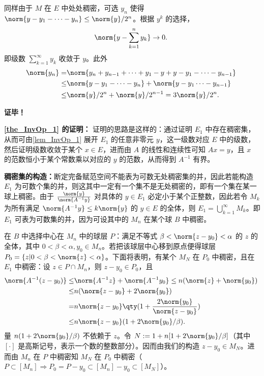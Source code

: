 同样由于 $M$ 在 $E$ 中处处稠密，可选 $y_n$ 使得 $\norm{y-y_1-\cdots-y_n}\leq\norm{y}/2^n$。根据 $y^k$ 的选择，
\begin{equation}
\norm{y-\sum_{k=1}^n y_k}\rightarrow0.~
\end{equation}
即级数 $\sum_{k=1}^\infty y_k$ 收敛于 $y$。此外
\begin{equation}
\begin{aligned}
\norm{y_n}=&\norm{y_n+y_{n-1}+\cdots+y_1-y+y-y_1-\cdots-y_{n-1}}\\
\leq&\norm{y-y_1-\cdots-y_{n}}+\norm{y-y_1\cdots-y_{n-1}}\\
\leq&\norm{y}/2^n+\norm{y}/2^{n-1}=3\norm{y}/2^n.
\end{aligned}~
\end{equation}

\textbf{证毕！}

\textbf{\autoref{the_InvOp_1} 的证明：}
证明的思路是这样的：通过证明 $E_1$ 中存在稠密集，从而可由\autoref{lem_InvOp_1} 展开 $E_1$ 的任意非零元 $y$，这一级数对应 $E$ 中的级数，然后证明级数收敛于某个 $x\in E$，进而由 $A$ 的线性和连续性可知 $Ax=y$，且 $x$ 的范数恒小于某个常数乘以对应的 $y$ 的范数，从而得到 $A^{-1}$ 有界。

\textbf{稠密集的构造：}断定完备赋范空间不能表为可数无处稠密集的并，因此若能构造 $E_1$ 为可数个集的并，则这其中一定有一个集不是无处稠密的，即有一个集在某一球上稠密。由于 $\frac{\norm{y}}{\norm{A^{-1}y}}$ 对具体的 $y\in E_1$ 必定小于某个正整数，因此若令 $M_k$ 为所有满足 $\norm{A^{-1}y}\leq k\norm{y}$ 的 $y\in E$ 的全体，则 $E_1=\bigcup\limits_{k=1}^\infty M_k$。即 $E_1$ 可表为可数集的并，因为可设其中的 $M_n$ 在某个球 $B$ 中稠密。

在 $B$ 中选择中心在 $M_n$ 中的球层 $P$：满足不等式 $\beta<\norm{z-y_0}<\alpha$ 的 $z$ 的全体，其中 $0<\beta<\alpha,y_0\in M_n$。若把该球层中心移到原点便得球层 $P_0=\{z|0<\beta<\norm{z}<\alpha\}$。下面将表明，有某个 $M_N$ 在 $P_0$ 中稠密，且在 $E_1$ 中稠密：设 $z\in P\cap M_n$，则 $z-y_0\in P_0$，且
\begin{equation}
\begin{aligned}
\norm{A^{-1}(z-y_0)}\leq&\norm{A^{-1}z}+\norm{A^{-1}y_0}\leq n(\norm{z}+\norm{y_0})\\
\leq&n(\norm{z-y_0}+2\norm{y_0})\\
=&n\norm{z-y_0}\qty(1+\frac{2\norm{y_0}}{\norm{z-y_0}})\\
\leq& n\norm{z-y_0}(1+2\norm{y_0}/\beta).
\end{aligned}~
\end{equation}
量 $n(1+2\norm{y_0}/\beta)$ 不依赖于 $z$。令 $N:=1+n[1+2\norm{y_0}/\beta]$（其中 $[\cdot]$ 是高斯记号，表示一个数的整数部分）。因而由我们的构造 $z-y_0\in M_N$。进而由 $M_n$ 在 $P$ 中稠密知 $M_N$ 在 $P_0$ 中稠密（$P\subset[M_n]\Rightarrow P_0=P-y_0\subset[M_n]-y_0\subset[M_N]$）。

